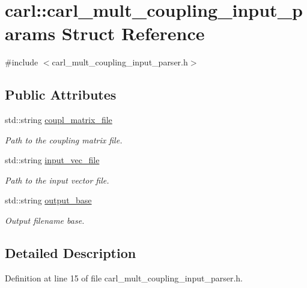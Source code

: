 \hypertarget{structcarl_1_1carl__mult__coupling__input__params}{}\section{carl\+:\+:carl\+\_\+mult\+\_\+coupling\+\_\+input\+\_\+params Struct Reference}
\label{structcarl_1_1carl__mult__coupling__input__params}


{\ttfamily \#include $<$carl\+\_\+mult\+\_\+coupling\+\_\+input\+\_\+parser.\+h$>$}

\subsection*{Public Attributes}
\begin{DoxyCompactItemize}
\item 
std\+::string \hyperlink{structcarl_1_1carl__mult__coupling__input__params_a3ad1c5068c4613c3e8b15d64125c4a04}{coupl\+\_\+matrix\+\_\+file}
\begin{DoxyCompactList}\small\item\em Path to the coupling matrix file. \end{DoxyCompactList}\item 
std\+::string \hyperlink{structcarl_1_1carl__mult__coupling__input__params_ad87a4f40746d5fca6085a280adaaa3d0}{input\+\_\+vec\+\_\+file}
\begin{DoxyCompactList}\small\item\em Path to the input vector file. \end{DoxyCompactList}\item 
std\+::string \hyperlink{structcarl_1_1carl__mult__coupling__input__params_ae8b0746e5db705a3ece18ea951b8b9c4}{output\+\_\+base}
\begin{DoxyCompactList}\small\item\em Output filename base. \end{DoxyCompactList}\end{DoxyCompactItemize}


\subsection{Detailed Description}


Definition at line 15 of file carl\+\_\+mult\+\_\+coupling\+\_\+input\+\_\+parser.\+h.



